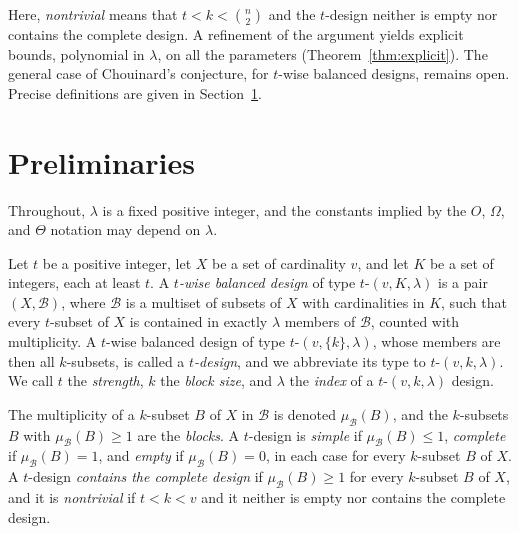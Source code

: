 \documentclass[12pt]{amsart}
\theoremstyle{definition}
\newcommand{\cB}{\mathcal{B}}
\begin{document}
Here, \emph{nontrivial} means that $t < k < \binom{n}{2}$ and the $t$-design
neither is empty nor contains the complete design. A refinement of the
argument yields explicit bounds, polynomial in $\lambda$, on all the
parameters (Theorem~\ref{thm:explicit}). The general case of Chouinard's
conjecture, for $t$-wise balanced designs, remains open. Precise definitions
are given in Section~\ref{sec:preliminaries}.

\section{Preliminaries}
\label{sec:preliminaries}

Throughout, $\lambda$ is a fixed positive integer, and the constants implied
by the $O$, $\Omega$, and $\Theta$ notation may depend on $\lambda$.

Let $t$ be a positive integer, let $X$ be a set of cardinality $v$, and let
$K$ be a set of integers, each at least $t$. A \emph{$t$-wise balanced
design} of type $t$-$(v, K, \lambda)$ is a pair $(X, \cB)$, where $\cB$ is a
multiset of subsets of $X$ with cardinalities in $K$, such that every
$t$-subset of $X$ is contained in exactly $\lambda$ members of $\cB$,
counted with multiplicity. A $t$-wise balanced design of type $t$-$(v,
\{k\}, \lambda)$, whose members are then all $k$-subsets, is called a
\emph{$t$-design}, and we abbreviate its type to $t$-$(v, k, \lambda)$. We
call $t$ the \emph{strength}, $k$ the \emph{block size}, and $\lambda$ the
\emph{index} of a $t$-$(v, k, \lambda)$ design.

The multiplicity of a $k$-subset $B$ of $X$ in $\cB$ is denoted
$\mu_{\cB}(B)$, and the $k$-subsets $B$ with $\mu_{\cB}(B) \geq 1$ are the
\emph{blocks}. A $t$-design is \emph{simple} if $\mu_{\cB}(B) \leq 1$,
\emph{complete} if $\mu_{\cB}(B) = 1$, and \emph{empty} if $\mu_{\cB}(B) =
0$, in each case for every $k$-subset $B$ of $X$. A $t$-design
\emph{contains the complete design} if $\mu_{\cB}(B) \geq 1$ for every
$k$-subset $B$ of $X$, and it is \emph{nontrivial} if $t < k < v$ and it
neither is empty nor contains the complete design.
\end{document}
